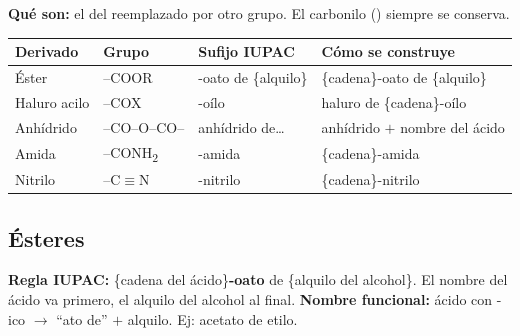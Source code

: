 \newpage


{}
\section*{\centering\fontsize{12}{18}}

\textbf{Qué son:} el  del  reemplazado por otro grupo. El carbonilo
() siempre se conserva.

\begin{center}
\renewcommand{\arraystretch}{1.5}
\begin{longtable}{L{2.6cm} L{2.8cm} L{3.2cm} L{4.9cm}}
\toprule
\textbf{Derivado} & \textbf{Grupo} & \textbf{Sufijo IUPAC} & \textbf{Cómo se construye} \\
\midrule\endhead\bottomrule\endlastfoot
Éster        & \mbox{--COOR}                        & -oato de \{alquilo\}   & \{cadena\}-oato de \{alquilo\} \\
Haluro acilo & \mbox{--COX}                         & -oílo                  & haluro de \{cadena\}-oílo \\
Anhídrido    & \mbox{--CO--O--CO--}                 & anhídrido de\ldots     & anhídrido $+$ nombre del ácido \\
Amida        & \mbox{--CONH\textsubscript{2}}        & -amida                 & \{cadena\}-amida \\
Nitrilo      & \mbox{--C$\equiv$N}                  & -nitrilo               & \{cadena\}-nitrilo \\
\end{longtable}
\end{center}

{}
\subsection*{\textcolor{blueunam}{Ésteres}}

\textbf{Regla IUPAC:} \{cadena del ácido\}\textbf{-oato} de \{alquilo del alcohol\}.
El nombre del ácido va primero, el alquilo del alcohol al final.
\textbf{Nombre funcional:} ácido con -ico $\to$ ``ato de'' $+$ alquilo. Ej: acetato de etilo.

